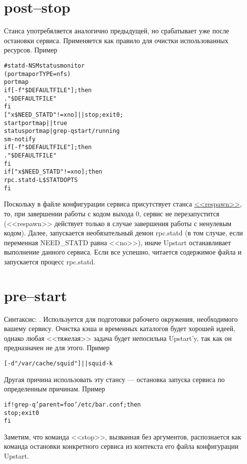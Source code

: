 \section{post--stop} \label{sec:PostStop}
Станса употребяляется аналогично предыдущей, но срабатывает уже после остановки сервиса. Применяется как правило для очистки использованных ресурсов. Пример \begin{alltt}
# statd - NSM status monitor
( portmap or  TYPE=nfs)
  portmap
if [ -f "\$DEFAULTFILE" ]; then
. "\$DEFAULTFILE"
fi
[ "x\$NEED_STATD" != xno ] || { stop; exit 0; }
start portmap || true
status portmap | grep -q start/running
 sm-notify
if [ -f "\$DEFAULTFILE" ]; then
. "\$DEFAULTFILE"
fi
if [ "x\$NEED\_STATD" != xno ]; then
 rpc.statd -L \$STATDOPTS
fi
\end{alltt}
Поскольку в файле конфигурации сервиса присутствует станса \hyperref[sec:respawn]{<<respawn>>}, то, при завершении работы с кодом выхода 0, сервис не перезапустится (<<respawn>> действует только в случае завершения работы с ненулевым кодом). Далее, запускается необязательный демон rpc.statd (в том случае, если переменная NEED\_STATD равна <<no>>), иначе Upstart останавливает выполнение данного сервиса. Если все успешно, читается содержимое файла  и запускается процесс rpc.statd.
\section{pre--start} \label{sec:PreStart}
Синтаксис: . Используется для подготовки рабочего окружения, необходимого вашему сервису. Очистка кэша и временных каталогов будет хорошей идеей, однако любая <<тяжелая>> задача будет непосильна Upstart'y, так как он предназначен не для этого. Пример \begin{alltt}
[ -d "/var/cache/squid" ] || squid -k
\end{alltt} Другая причина использовать эту стансу --- остановка запуска сервиса по определенным причинам. Пример \begin{alltt}
if ! grep -q 'parent=foo' /etc/bar.conf ; then
stop ; exit 0
fi
\end{alltt} Заметим, что команда <<stop>>, вызванная без аргументов, распознается как команда остановки конкретного сервиса из контекста его файла конфигурации Upstart.
